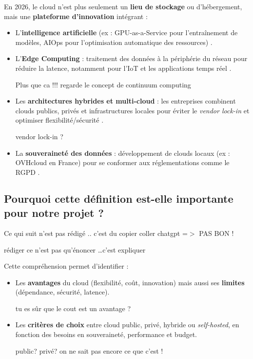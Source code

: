\documentclass{rapportClass} %
\begin{document}
En 2026, le cloud n’est plus seulement un \textbf{lieu de stockage} ou
d’hébergement, mais une \textbf{plateforme d’innovation} intégrant :
\begin{itemize}
\item L’\textbf{intelligence artificielle} (ex : GPU-as-a-Service pour
  l’entraînement de modèles, AIOps pour l’optimisation automatique des
  ressources) \cite{LeBigData2026}.
\item L’\textbf{Edge Computing} : traitement des données à la
  périphérie du réseau pour réduire la latence, notamment pour l’IoT
  et les applications temps réel \cite{Syslearn2026}.

  {\color{red} Plus que ca !!! regarde le concept de continuum computing }
  
\item Les \textbf{architectures hybrides et multi-cloud} : les
  entreprises combinent clouds publics, privés et infrastructures
  locales pour éviter le \textit{vendor lock-in} et optimiser
  flexibilité/sécurité \cite{ObjetConnecte2026}.

  {\color{red} vendor lock-in ? }

  
\item La \textbf{souveraineté des données} : développement de clouds
  locaux (ex : OVHcloud en France) pour se conformer aux
  réglementations comme le RGPD \cite{TechInsider2026}.
\end{itemize}

\subsection{Pourquoi cette définition est-elle importante pour notre projet ?}

{\color{red} Ce qui suit n'est pas rédigé .. c'est du copier coller chatgpt  =$>$ PAS BON !}

\begin{Huge}
  {\color{red}rédiger ce n'est pas qu'énoncer \ldots c'est expliquer}  
\end{Huge}


Cette compréhension permet d’identifier :
\begin{itemize}
\item Les \textbf{avantages} du cloud (flexibilité, coût, innovation)
  mais aussi ses \textbf{limites} (dépendance, sécurité, latence).

  {\color{red} tu es sûr que le cout est un avantage  ?}
\item Les \textbf{critères de choix} entre cloud public, privé,
  hybride ou \textit{self-hosted}, en fonction des besoins en
  souveraineté, performance et budget.

  {\color{red} public? privé? on ne sait pas encore ce que c'est !}
\end{itemize}
\end{document}
